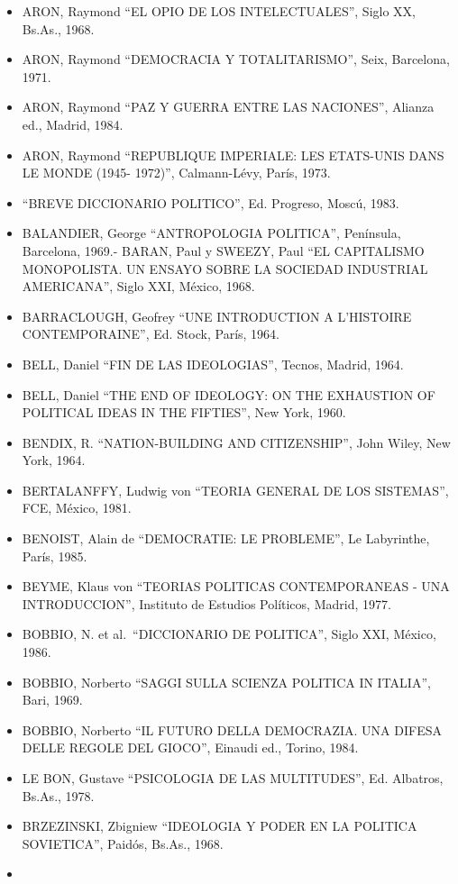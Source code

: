 \documentclass[
]{book}
\providecommand{\tightlist}{%
  \setlength{\itemsep}{0pt}\setlength{\parskip}{0pt}}
\begin{document}
\begin{itemize}
\tightlist
\item
  ARON, Raymond ``EL OPIO DE LOS INTELECTUALES'', Siglo XX, Bs.As., 1968.
\item
  ARON, Raymond ``DEMOCRACIA Y TOTALITARISMO'', Seix, Barcelona, 1971.
\item
  ARON, Raymond ``PAZ Y GUERRA ENTRE LAS NACIONES'', Alianza ed., Madrid, 1984.
\item
  ARON, Raymond ``REPUBLIQUE IMPERIALE: LES ETATS-UNIS DANS LE MONDE (1945-
  1972)'', Calmann-Lévy, París, 1973.
\item
  ``BREVE DICCIONARIO POLITICO'', Ed. Progreso, Moscú, 1983.
\item
  BALANDIER, George ``ANTROPOLOGIA POLITICA'', Península, Barcelona, 1969.- BARAN, Paul y SWEEZY, Paul ``EL CAPITALISMO MONOPOLISTA. UN ENSAYO SOBRE LA
  SOCIEDAD INDUSTRIAL AMERICANA'', Siglo XXI, México, 1968.
\item
  BARRACLOUGH, Geofrey ``UNE INTRODUCTION A L'HISTOIRE CONTEMPORAINE'', Ed.
  Stock, París, 1964.
\item
  BELL, Daniel ``FIN DE LAS IDEOLOGIAS'', Tecnos, Madrid, 1964.
\item
  BELL, Daniel ``THE END OF IDEOLOGY: ON THE EXHAUSTION OF POLITICAL IDEAS IN
  THE FIFTIES'', New York, 1960.
\item
  BENDIX, R. ``NATION-BUILDING AND CITIZENSHIP'', John Wiley, New York, 1964.
\item
  BERTALANFFY, Ludwig von ``TEORIA GENERAL DE LOS SISTEMAS'', FCE, México, 1981.
\item
  BENOIST, Alain de ``DEMOCRATIE: LE PROBLEME'', Le Labyrinthe, París, 1985.
\item
  BEYME, Klaus von ``TEORIAS POLITICAS CONTEMPORANEAS - UNA INTRODUCCION'',
  Instituto de Estudios Políticos, Madrid, 1977.
\item
  BOBBIO, N. et al.~``DICCIONARIO DE POLITICA'', Siglo XXI, México, 1986.
\item
  BOBBIO, Norberto ``SAGGI SULLA SCIENZA POLITICA IN ITALIA'', Bari, 1969.
\item
  BOBBIO, Norberto ``IL FUTURO DELLA DEMOCRAZIA. UNA DIFESA DELLE REGOLE DEL
  GIOCO'', Einaudi ed., Torino, 1984.
\item
  LE BON, Gustave ``PSICOLOGIA DE LAS MULTITUDES'', Ed. Albatros, Bs.As., 1978.
\item
  BRZEZINSKI, Zbigniew ``IDEOLOGIA Y PODER EN LA POLITICA SOVIETICA'', Paidós,
  Bs.As., 1968.
\item

\end{itemize}
\end{document}
